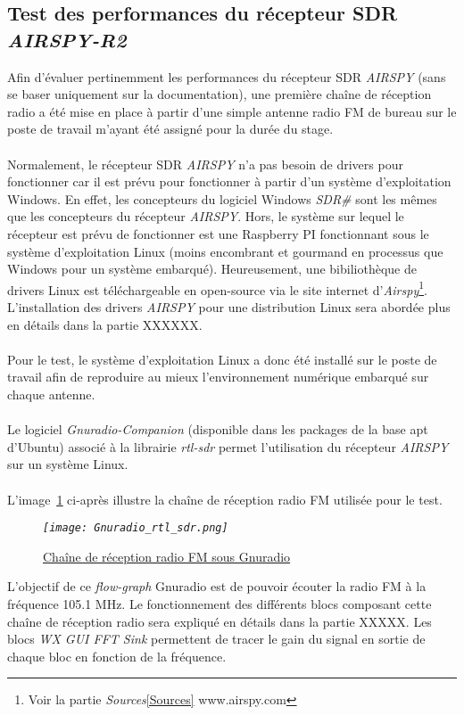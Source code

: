 \documentclass[12pt,fleqn]{book} %
\begin{document}
\subsection{Test des performances du récepteur SDR \emph{AIRSPY-R2}}
Afin d'évaluer pertinemment les performances du récepteur SDR \emph{AIRSPY} (sans se baser uniquement sur la documentation), une première chaîne de réception radio a été mise en place à partir d'une simple antenne radio FM de bureau sur le poste de travail m'ayant été assigné pour la durée du stage.
~\\\\Normalement, le récepteur SDR \emph{AIRSPY} n'a pas besoin de drivers pour fonctionner car il est prévu pour fonctionner à partir d'un système d'exploitation Windows. En effet, les concepteurs du logiciel Windows \emph{SDR\#} sont les mêmes que les concepteurs du récepteur \emph{AIRSPY}. Hors, le système sur lequel le récepteur est prévu de fonctionner est une Raspberry PI fonctionnant sous le système d'exploitation Linux (moins encombrant et gourmand en processus que Windows pour un système embarqué). Heureusement, une bibiliothèque de drivers Linux est téléchargeable en open-source via le site internet d'\emph{Airspy}\footnote{Voir la partie \emph{Sources}\ref{Sources} www.airspy.com}. L'installation des drivers \emph{AIRSPY} pour une distribution Linux sera abordée plus en détails dans la partie XXXXXX.
~\\\\Pour le test, le système d'exploitation Linux a donc été installé sur le poste de travail afin de reproduire au mieux l'environnement numérique embarqué sur chaque antenne.
~\\\\Le logiciel \emph{Gnuradio-Companion} (disponible dans les packages de la base apt d'Ubuntu) associé à la librairie \emph{rtl-sdr} permet l'utilisation du récepteur \emph{AIRSPY} sur un système Linux. 
~\\\\L'image~\underline{\color{blue}\ref{gnu_airspy}} ci-après illustre la chaîne de réception radio FM utilisée pour le test.
\begin{figure}[H]
	\centering
	\itshape
	\texttt{[image: Gnuradio\_rtl\_sdr.png]}
	\caption{\label{gnu_airspy} \underline{Chaîne de réception radio FM sous Gnuradio}}
\end{figure}
L'objectif de ce \emph{flow-graph} Gnuradio est de pouvoir écouter la radio FM à la fréquence 105.1 MHz. Le fonctionnement des différents blocs composant cette chaîne de réception radio sera expliqué en détails dans la partie XXXXX. Les blocs \emph{WX GUI FFT Sink} permettent de tracer le gain du signal en sortie de chaque bloc en fonction de la fréquence.
\end{document}
